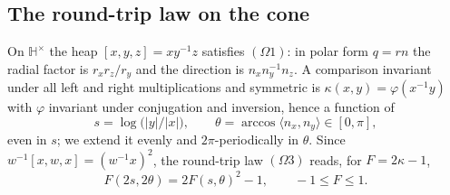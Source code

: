\documentclass[aps,pra,onecolumn,superscriptaddress,nofootinbib,10pt]{revtex4-2}
\theoremstyle{definition}
\theoremstyle{remark}
\newcommand{\HH}{\mathbb{H}}
\newcommand{\ip}[2]{\langle #1,#2\rangle}
\newcommand{\hp}[3]{[#1,#2,#3]}
\begin{document}
\subsection{The round-trip law on the cone}
On $\HH^\times$ the heap $\hp xyz=xy^{-1}z$ satisfies $(\Omega1)$: in polar form $q=rn$ the radial factor is $r_xr_z/r_y$
and the direction is $n_xn_y^{-1}n_z$.  A comparison invariant under all left and right multiplications and
symmetric is $\kappa(x,y)=\varphi(x^{-1}y)$ with $\varphi$ invariant under conjugation and inversion, hence a function of
\[
s=\log\bigl(\lvert y\rvert/\lvert x\rvert\bigr),\qquad \theta=\arccos\ip{n_x}{n_y}\in[0,\pi],
\]
even in $s$; we extend it evenly and $2\pi$-periodically in $\theta$.  Since $w^{-1}\hp xwx=(w^{-1}x)^2$, the round-trip
law $(\Omega3)$ reads, for $F=2\kappa-1$,
\begin{equation}\label{eq:conelaw}
F(2s,2\theta)=2F(s,\theta)^2-1,\qquad -1\le F\le1 .
\end{equation}
\end{document}
